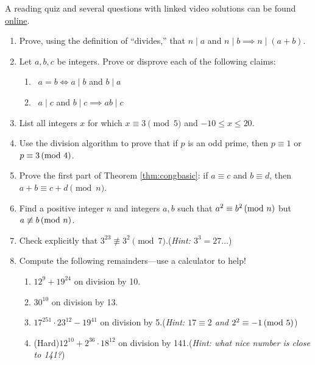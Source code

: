 \begin{exercises}{}{}
	A reading quiz and several questions with linked video solutions can be found \href{http://www.math.uci.edu/~ndonalds/math13/selftest/3-1-cong.html}{online}.


	\begin{enumerate}  
		\item Prove, using the definition of ``divides,'' that $n\mid a$ and $n\mid b\implies n\mid(a+b)$.
		
		
		\item Let $a,b,c$ be integers. Prove or disprove each of the following claims:
		\begin{enumerate}
		  \item{} \ $a=b\iff a\mid b$ and $b\mid a$
		  \setcounter{enumi}{2}
		  \item{} \ $a\mid c$ and $b\mid c\implies ab\mid c$
	  \end{enumerate}
	  
	  
	  \item List all integers $x$ for which $x\equiv 3\pmod 5$ and $-10\le x\le 20$.
	  
	  
	  \item Use the division algorithm to prove that if $p$ is an odd prime, then $p\equiv 1$ or $p\equiv 3\negthickspace\pmod{4}$.
	  
	  
	  \item Prove the first part of Theorem \ref{thm:congbasic}: if $a\equiv c$ and $b\equiv d$, then $a+b\equiv c+d\pmod n$.
	 
	 
	  \item Find a positive integer $n$ and integers $a,b$ such that $a^2\equiv b^2\negthickspace\pmod{n}$ but $a\not\equiv b\negthickspace\pmod{n}$.
	  
	  
	  \item Check explicitly that $3^{23}\not\equiv 3^2\pmod 7$.\quad (\emph{Hint: $3^3=27\ldots$})
	  
	  
	  \item Compute the following remainders---use a calculator to help!
	  \begin{enumerate}
	  	\item $12^9+19^{24}$ on division by 10.
	  	\item $30^{10}$ on division by 13.
	  	\item $17^{251}\cdot 23^{12}-19^{41}$ on division by 5.\qquad (\emph{Hint: $17\equiv 2$ and $2^2\equiv -1\negthickspace\pmod{5}$})
	  	\item (Hard)\lstsp $12^{10}+2^{36}\cdot 18^{12}$ on division by 141.\qquad	(\emph{Hint: what nice number is close to 141?})
	  \end{enumerate}
	  

\end{enumerate}
\end{exercises}
